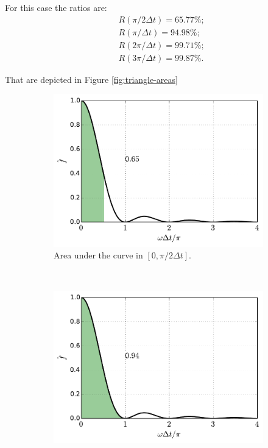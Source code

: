 \documentclass[12pt,letterpaper]{article}
\begin{document}
{For this case the ratios are:
\begin{align*}
    &R(\pi/2\Delta t) = 65.77\%;\\
    &R(\pi/\Delta t) = 94.98\%;\\
    &R(2\pi/\Delta t) = 99.71\%;\\
    &R(3\pi/\Delta t) = 99.87\%.
\end{align*}

That are depicted in Figure \ref{fig:triangle-areas}
\begin{figure}[H]
    \centering
    \begin{subfigure}[b]{0.45\textwidth}
        \includegraphics[width=\textwidth]{img/triangle_area=1.pdf}
        \caption{Area under the curve in $[0,\pi/2\Delta t]$.}
    \end{subfigure}\
    \begin{subfigure}[b]{0.45\textwidth}
        \includegraphics[width=\textwidth]{img/triangle_area=2.pdf}

\end{subfigure}
\end{figure}}
\end{document}
